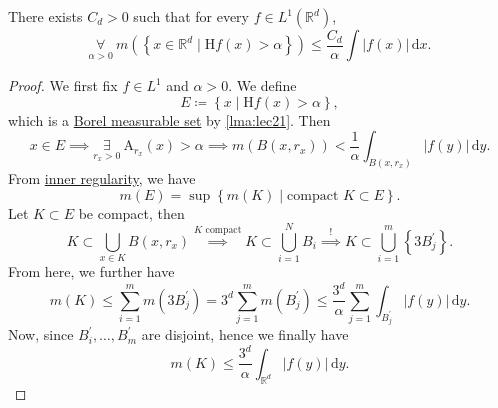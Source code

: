 \begin{theorem}\label{thm:HL-maximal-inequality}
	There exists \(C_{d} >0\) such that for every \(f\in L^1(\mathbb{R} ^d)\),
	\[
		\underset{\alpha >0}{\forall }\ m\left(\left\{x\in \mathbb{R} ^d\mid \mathrm{H}f(x) > \alpha  \right\}\right) \leq \frac{C_{d} }{\alpha }\int \left\vert f(x) \right\vert \,\mathrm{d} x.
	\]
\end{theorem}
\begin{proof}
	We first fix \(f\in L^1\) and \(\alpha >0\). We define
	\[
		E\coloneqq \left\{x\mid \mathrm{H}f (x) > \alpha \right\},
	\]
	which is a \hyperref[def:measurable-set]{Borel measurable set} by \autoref{lma:lec21}. Then
	\[
		x\in E\implies \underset{r_{x} >0}{\exists } \ \mathrm{A} _{r_{x} }(x)> \alpha \implies m(B(x, r_{x} ))< \frac{1}{\alpha }\int _{B(x, r_{x} )}\left\vert f(y) \right\vert \,\mathrm{d} y.
	\]
	From \hyperref[thm:inner-regularity]{inner regularity}, we have
	\[
		m(E) = \sup \left\{m(K)\mid \text{compact }K\subset E \right\}.
	\]
	Let \(K\subset E\) be compact, then
	\[
		K\subset \bigcup\limits_{x\in K}B(x, r_{x} ) \overset{K \text{ compact} }{\implies } K\subset \bigcup\limits_{i=1}^{N} B_{i} \overset{\hyperref[lma:Vitali-type-covering-lemma]{!}}{\implies} K\subset \bigcup\limits_{i=1}^{m} \left\{3 B_{j} ^\prime \right\}.
	\]
	From here, we further have
	\[
		m(K) \leq \sum\limits_{i=1}^{m} m(3 B_{j} ^\prime ) = 3^d \sum\limits_{j=1}^{m} m(B_{j} ^\prime ) \leq \frac{3^d}{\alpha }\sum\limits_{j=1}^{m} \int _{B_{j} ^\prime }\left\vert f(y) \right\vert \,\mathrm{d}y.
	\]
	Now, since \(B^\prime _{i} , \ldots , B^\prime _{m}  \) are disjoint, hence we finally have
	\[
		m(K) \leq \frac{3^d}{\alpha }\int _{\mathbb{R} ^d}\left\vert f(y) \right\vert \,\mathrm{d} y.
	\]
\end{proof}